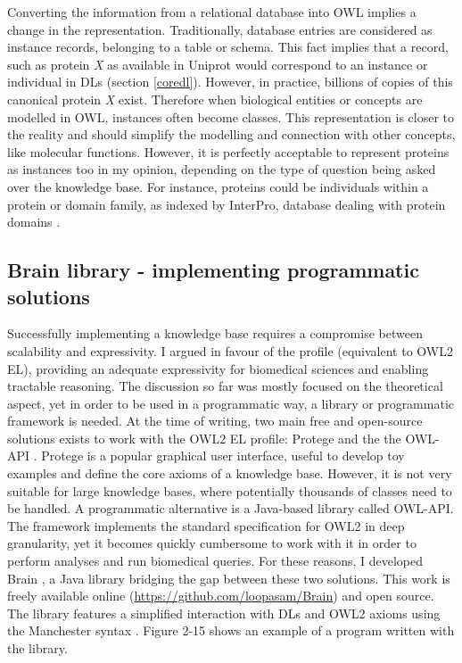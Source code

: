 Converting the information from a relational database into OWL implies a change in the representation. Traditionally, database entries are considered as instance records, belonging to a table or schema. This fact implies that a record, such as protein \emph{X} as available in Uniprot would correspond to an instance or individual in DLs (section \ref{coredl}). However, in practice, billions of copies of this canonical protein \emph{X} exist. Therefore when biological entities or concepts are modelled in OWL, instances often become classes. This representation is closer to the reality and should simplify the modelling and connection with other concepts, like molecular functions. However, it is perfectly acceptable to represent proteins as instances too in my opinion, depending on the type of question being asked over the knowledge base. For instance, proteins could be individuals within a protein or domain family, as indexed by InterPro, database dealing with protein domains \citep{zdobnov2001interproscan}.

\subsection{Brain library - implementing programmatic solutions}

Successfully implementing a knowledge base requires a compromise between scalability and expressivity. I argued in favour of the  profile (equivalent to OWL2 EL), providing an adequate expressivity for biomedical sciences and enabling tractable reasoning. The discussion so far was mostly focused on the theoretical aspect, yet in order to be used in a programmatic way, a library or programmatic framework is needed. At the time of writing, two main free and open-source solutions exists to work with the OWL2 EL profile: Protege \citep{knublauch2005protege} and the the OWL-API \citep{horridge2011owl}. Protege is a popular graphical user interface, useful to develop toy examples and define the core axioms of a knowledge base. However, it is not very suitable for large knowledge bases, where potentially thousands of classes need to be handled. A programmatic alternative is a Java-based library called OWL-API. The framework implements the standard specification for OWL2 in deep granularity, yet it becomes quickly cumbersome to work with it in order to perform analyses and run biomedical queries. For these reasons, I developed Brain \citep{croset2013brain}, a Java library bridging the gap between these two solutions. This work is freely available online (\url{https://github.com/loopasam/Brain}) and open source. The library features a simplified interaction with DLs and OWL2 axioms using the Manchester syntax \citep{horridge2006manchester}. Figure 2-15 shows an example of a program written with the library.

